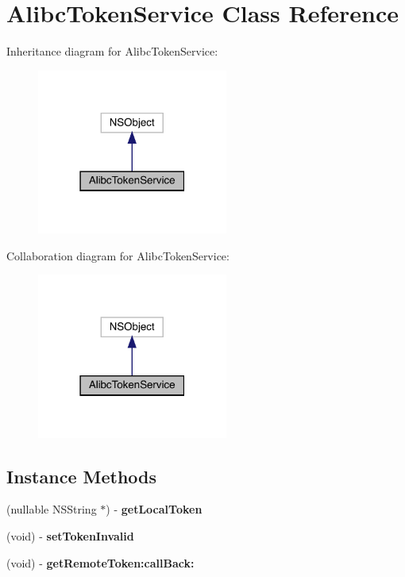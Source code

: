 \hypertarget{interface_alibc_token_service}{}\section{Alibc\+Token\+Service Class Reference}
\label{interface_alibc_token_service}


Inheritance diagram for Alibc\+Token\+Service\+:\nopagebreak
\begin{figure}[H]
\begin{center}
\leavevmode
\includegraphics[width=178pt]{interface_alibc_token_service__inherit__graph}
\end{center}
\end{figure}


Collaboration diagram for Alibc\+Token\+Service\+:\nopagebreak
\begin{figure}[H]
\begin{center}
\leavevmode
\includegraphics[width=178pt]{interface_alibc_token_service__coll__graph}
\end{center}
\end{figure}
\subsection*{Instance Methods}
\begin{DoxyCompactItemize}
\item 
\mbox{\label{interface_alibc_token_service_af308c0944a54102751c69fb890c333c0}} 
(nullable N\+S\+String $\ast$) -\/ {\bfseries get\+Local\+Token}
\item 
\mbox{\label{interface_alibc_token_service_a3dd4c1e268250d56100569d7a221f48d}} 
(void) -\/ {\bfseries set\+Token\+Invalid}
\item 
\mbox{\label{interface_alibc_token_service_afad19534e06d0af5a720f004b51d52bf}} 
(void) -\/ {\bfseries get\+Remote\+Token\+:call\+Back\+:}
\end{DoxyCompactItemize}
